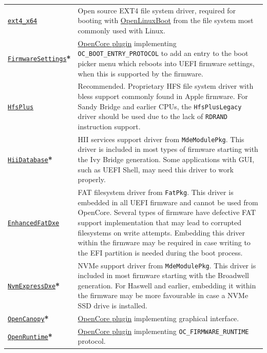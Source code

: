 \documentclass[]{article}
\begin{document}
\begin{longtable}{p{1.65in}p{5.25in}}
\href{https://github.com/acidanthera/OcBinaryData}{\texttt{ext4\_x64}}
& Open source EXT4 file system driver, required for booting with \hyperref[uefilinux]{OpenLinuxBoot}
  from the file system most commonly used with Linux. \\
\href{https://github.com/acidanthera/OpenCorePkg}{\texttt{FirmwareSettings}}\textbf{*}
& \hyperref[firmwaresettings]{OpenCore plugin} implementing \texttt{OC\_BOOT\_ENTRY\_PROTOCOL}
  to add an entry to the boot picker menu which reboots into UEFI firmware settings,
  when this is supported by the firmware. \\
\href{https://github.com/acidanthera/OcBinaryData}{\texttt{HfsPlus}}
& Recommended. Proprietary HFS file system driver with bless support commonly found in Apple
  firmware. For Sandy Bridge and earlier CPUs, the \texttt{HfsPlusLegacy} driver should be
  used due to the lack of \texttt{RDRAND} instruction support. \\
\href{https://github.com/acidanthera/audk}{\texttt{HiiDatabase}}\textbf{*}
& HII services support driver from \texttt{MdeModulePkg}. This driver is included in
  most types of firmware starting with the Ivy Bridge generation. Some applications with GUI,
  such as UEFI Shell, may need this driver to work properly. \\
\href{https://github.com/acidanthera/audk}{\texttt{EnhancedFatDxe}}
& FAT filesystem driver from \texttt{FatPkg}. This driver is embedded in all
  UEFI firmware and cannot be used from OpenCore. Several types of firmware
  have defective FAT support implementation that may lead to corrupted filesystems
  on write attempts. Embedding this driver within the firmware may be required in case
  writing to the EFI partition is needed during the boot process. \\
\href{https://github.com/acidanthera/audk}{\texttt{NvmExpressDxe}}\textbf{*}
& NVMe support driver from \texttt{MdeModulePkg}. This driver is included in most
  firmware starting with the Broadwell generation. For Haswell and earlier, embedding it
  within the firmware may be more favourable in case a NVMe SSD drive is installed. \\
\href{https://github.com/acidanthera/OpenCorePkg}{\texttt{OpenCanopy}}\textbf{*}
& \hyperref[ueficanopy]{OpenCore plugin} implementing graphical interface. \\
\href{https://github.com/acidanthera/OpenCorePkg}{\texttt{OpenRuntime}}\textbf{*}
& \hyperref[uefiruntime]{OpenCore plugin} implementing \texttt{OC\_FIRMWARE\_RUNTIME} protocol. \\

\end{longtable}
\end{document}
